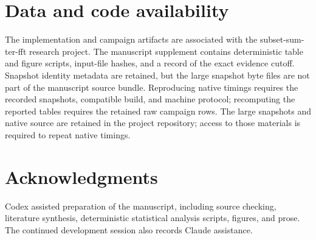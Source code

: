 \documentclass[manuscript,screen,review]{acmart}
\begin{document}
\section{Data and code availability}
The implementation and campaign artifacts are associated with the subset-sum-ter-fft research project. The manuscript supplement contains deterministic table and figure scripts, input-file hashes, and a record of the exact evidence cutoff. Snapshot identity metadata are retained, but the large snapshot byte files are not part of the manuscript source bundle. Reproducing native timings requires the recorded snapshots, compatible build, and machine protocol; recomputing the reported tables requires the retained raw campaign rows. The large snapshots and native source are retained in the project repository; access to those materials is required to repeat native timings.

\section{Acknowledgments}
Codex assisted preparation of the manuscript, including source checking, literature synthesis, deterministic statistical analysis scripts, figures, and prose. The continued development session also records Claude assistance.
\end{document}
